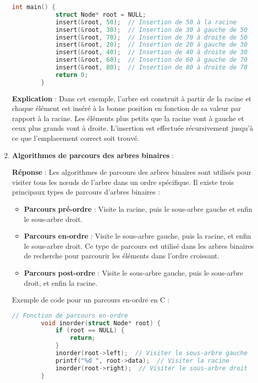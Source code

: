 \begin{enumerate}
	\begin{lstlisting}[language=C]
		int main() {
			struct Node* root = NULL;
			insert(&root, 50);  // Insertion de 50 à la racine
			insert(&root, 30);  // Insertion de 30 à gauche de 50
			insert(&root, 70);  // Insertion de 70 à droite de 50
			insert(&root, 20);  // Insertion de 20 à gauche de 30
			insert(&root, 40);  // Insertion de 40 à droite de 30
			insert(&root, 60);  // Insertion de 60 à gauche de 70
			insert(&root, 80);  // Insertion de 80 à droite de 70
			return 0;
		}
	\end{lstlisting}
	
	\textbf{Explication} :
	Dans cet exemple, l'arbre est construit à partir de la racine et chaque élément est inséré à la bonne position en fonction de sa valeur par rapport à la racine. Les éléments plus petits que la racine vont à gauche et ceux plus grands vont à droite. L'insertion est effectuée récursivement jusqu'à ce que l'emplacement correct soit trouvé.
	
	\item \textbf{Algorithmes de parcours des arbres binaires} :
	
	\textbf{Réponse} :
	Les algorithmes de parcours des arbres binaires sont utilisés pour visiter tous les nœuds de l'arbre dans un ordre spécifique. Il existe trois principaux types de parcours d'arbres binaires :
	
	\begin{itemize}
		\item \textbf{Parcours pré-ordre} : Visite la racine, puis le sous-arbre gauche et enfin le sous-arbre droit.
		\item \textbf{Parcours en-ordre} : Visite le sous-arbre gauche, puis la racine, et enfin le sous-arbre droit. Ce type de parcours est utilisé dans les arbres binaires de recherche pour parcourir les éléments dans l'ordre croissant.
		\item \textbf{Parcours post-ordre} : Visite le sous-arbre gauche, puis le sous-arbre droit, et enfin la racine.
	\end{itemize}
	
	Exemple de code pour un parcours en-ordre en C :
	
	\begin{lstlisting}[language=C]
		// Fonction de parcours en-ordre
		void inorder(struct Node* root) {
			if (root == NULL) {
				return;
			}
			inorder(root->left);  // Visiter le sous-arbre gauche
			printf("%d ", root->data);  // Visiter la racine
			inorder(root->right);  // Visiter le sous-arbre droit
		}
		

\end{lstlisting}
\end{enumerate}
